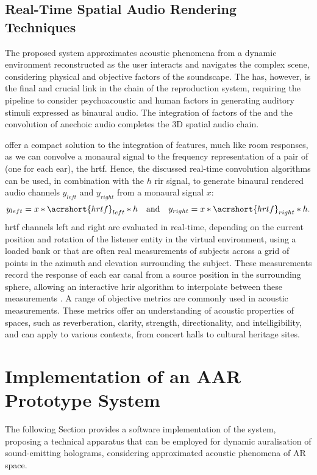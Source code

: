 \subsection{Real-Time Spatial Audio Rendering Techniques}
The proposed system approximates acoustic phenomena from a dynamic environment reconstructed as the user interacts and navigates the complex scene, considering physical and objective factors of the soundscape. The \acrshort{has}, however, is the final and crucial link in the chain of the reproduction system, requiring the pipeline to consider psychoacoustic and human factors in generating auditory stimuli expressed as binaural audio. The integration of factors of the  and the convolution of anechoic audio completes the 3D spatial audio chain.\par
{} offer a compact solution to the integration of  features, much like room responses, as we can convolve a monaural signal to the frequency representation of a pair of  (one for each ear), the \acrfull{hrtf}. Hence, the discussed real-time convolution algorithms \citep{kim2019immersive} can be used, in combination with the $h$ \acrshort{rir} signal, to generate binaural rendered audio channels $y_{left}$ and $y_{right}$ from a monaural signal $x$:
\begin{equation}
    y_{left} = x * \acrshort{hrtf}_{left} * h \quad \textrm{and} \quad  y_{right} = x * \acrshort{hrtf}_{right} * h \textrm{.}
\end{equation}
\acrshort{hrtf} channels left and right are evaluated in real-time, depending on the current position and rotation of the listener entity in the virtual environment, using a loaded bank or  that are often real measurements of subjects across a grid of points in the azimuth and elevation surrounding the subject. These measurements record the response of each ear canal from a source position in the surrounding sphere, allowing an interactive \acrshort{hrir} algorithm to interpolate between these measurements \citep{hoene2017mysofa}. A range of objective metrics are commonly used in acoustic measurements. These metrics offer an understanding of acoustic properties of spaces, such as reverberation, clarity, strength, directionality, and intelligibility, and can apply to various contexts, from concert halls to cultural heritage sites.

\section{Implementation of an AAR Prototype System}
The following Section provides a software implementation of the system, proposing a technical apparatus that can be employed for dynamic auralisation of sound-emitting holograms, considering approximated acoustic phenomena of AR space.

